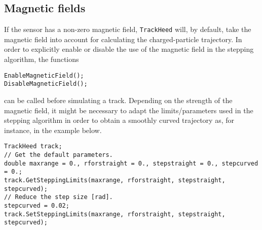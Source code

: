 \subsection{Magnetic fields}
If the sensor has a non-zero magnetic field, \texttt{TrackHeed} will, 
by default, take the magnetic field into account for 
calculating the charged-particle trajectory.  
In order to explicitly enable or disable the use of the magnetic field  
in the stepping algorithm, the functions 
\begin{lstlisting}
EnableMagneticField();
DisableMagneticField();
\end{lstlisting}
can be called before simulating a track.
Depending on the strength of the magnetic field, it might be necessary to adapt the 
limits/parameters used in the stepping algorithm in order to obtain a smoothly curved 
trajectory as, for instance, in the example below.
\begin{lstlisting}
TrackHeed track;
// Get the default parameters.
double maxrange = 0., rforstraight = 0., stepstraight = 0., stepcurved = 0.;
track.GetSteppingLimits(maxrange, rforstraight, stepstraight, stepcurved);
// Reduce the step size [rad]. 
stepcurved = 0.02;
track.SetSteppingLimits(maxrange, rforstraight, stepstraight, stepcurved);
\end{lstlisting} 

